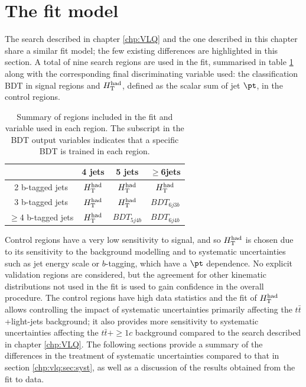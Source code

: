 \section{The fit model}

The search described in chapter \ref{chp:VLQ} and the one described in this chapter share a similar fit model; the few existing differences are highlighted in this section. A total of nine search regions are used in the fit, summarised in table \ref{sec:tth:tab:reg} along with the corresponding final discriminating variable used: the classification BDT in signal regions and $H_{\rm T}^{\rm had}$, defined as the scalar sum of jet $\pt$, in the control regions.
\begin{table}\footnotesize
\begin{center}
\begin{tabular}{|c|c|c|c|}
  \hline \hline
    & 4 jets & 5 jets & $\ge$6jets \\
  \hline
  2 b-tagged jets & $H_{\rm T}^{\rm had}$ & $H_{\rm T}^{\rm had}$ & $H_{\rm T}^{\rm had}$\\
  \hline
  3 b-tagged jets & $H_{\rm T}^{\rm had}$ & $H_{\rm T}^{\rm had}$ & $BDT_{6j3b}$\\
  \hline
  $\ge$4 b-tagged jets&$H_{\rm T}^{\rm had}$&$BDT_{5j4b}$&$BDT_{6j4b}$\\
 \hline \hline
\end{tabular}
\captionsetup{width=0.85\textwidth}  \caption{\small Summary of regions included in the fit and variable used in each region. The subscript in the BDT output variables indicates that a specific BDT is trained in each region.}
\label{sec:tth:tab:reg}
\end{center}
\end{table}
\par Control regions have a very low sensitivity to signal, and so $H_{\rm T}^{\rm had}$  is chosen due to its sensitivity to the background modelling and to systematic uncertainties such
as jet energy scale or $b$-tagging, which have a $\pt$ dependence. No explicit validation regions are considered, but the agreement for other kinematic distributions not used in the fit is used to gain confidence in the overall procedure. The control regions have high data statistics and the fit of $H_{\rm T}^{\rm had}$  allows controlling the impact of systematic uncertainties primarily affecting the $t\bar{t}$+light-jets background; it also provides more sensitivity to systematic uncertainties affecting the $t\bar{t}+\ge1c$ background compared to the search described in chapter \ref{chp:VLQ}. The following sections provide a summary of the differences in the treatment of systematic uncertainties compared to that in section \ref{chp:vlq:sec:syst}, as well as a discussion of the results obtained from the fit to data.


